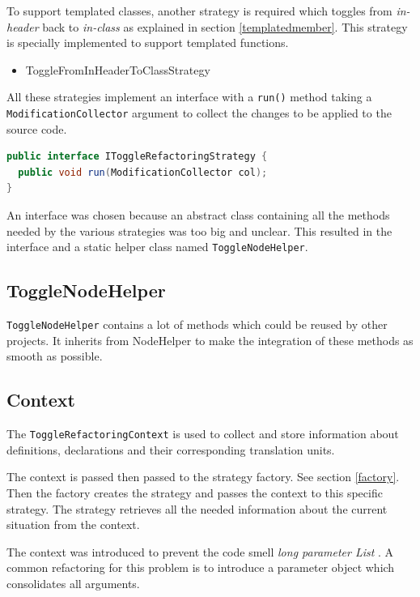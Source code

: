 To support templated classes, another strategy is required which toggles from
\textit{in-header} back to \textit{in-class} as explained in section
\ref{templatedmember}. This strategy is specially implemented to support
templated functions.

\begin{itemize}
\item ToggleFromInHeaderToClassStrategy
\end{itemize}

All these strategies implement an interface with a \texttt{run()} method taking
a \texttt{ModificationCollector} argument to collect the changes to be applied
to the source code.

\begin{lstlisting}[caption={IToggleRefactoringStrategy},
label={01templatedMember}, language=Java]
public interface IToggleRefactoringStrategy {
  public void run(ModificationCollector col);
}
\end{lstlisting}

An interface was chosen because an abstract class containing all the methods
needed by the various strategies was too big and unclear. This resulted in the
interface and a static helper class named \texttt{ToggleNodeHelper}.

\subsection{ToggleNodeHelper}

\texttt{ToggleNodeHelper} contains a lot of methods which could be reused by
other projects. It inherits from NodeHelper to make the integration of these
methods as smooth as possible.

\subsection{Context}

The \texttt{ToggleRefactoringContext} is used to collect and store information 
about definitions, declarations and their corresponding translation units.

The context is passed then passed to the strategy factory. See section
\ref{factory}. Then the factory creates the strategy and passes the context to
this specific strategy. The strategy retrieves all the needed information about
the current situation from the context.

The context was introduced to prevent the code smell \textit{long parameter
List} \cite{Refactoring}. A common refactoring for this problem is to
introduce a parameter object which consolidates all arguments.

